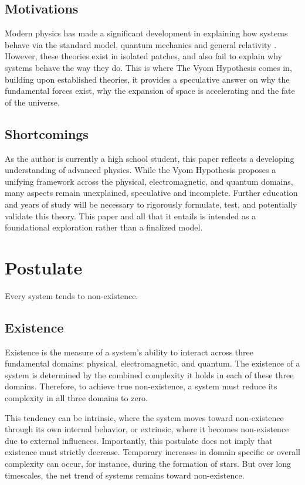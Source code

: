 \documentclass{article}
\begin{document}
\subsection{Motivations}
Modern physics has made a significant development in explaining how systems behave via the standard model, quantum mechanics \cite{dirac1930} and general relativity \cite{einstein1915}. However, these theories exist in isolated patches, and also fail to explain why systems behave the way they do. This is where The Vyom Hypothesis comes in, building upon established theories, it provides a speculative answer on why the fundamental forces exist, why the expansion of space is accelerating and the fate of the universe. 


\subsection{Shortcomings}
As the author is currently a high school student, this paper reflects a developing understanding of advanced physics. While the Vyom Hypothesis proposes a unifying framework across the physical, electromagnetic, and quantum domains, many aspects remain unexplained, speculative and incomplete. Further education and years of study will be necessary to rigorously formulate, test, and potentially validate this theory. This paper and all that it entails is intended as a foundational exploration rather than a finalized model.



\newpage
\section{Postulate}

\begin{center}
Every system tends to non-existence.
\end{center}

\subsection{Existence}
Existence is the measure of a system’s ability to interact across three fundamental domains: physical, electromagnetic, and quantum. The existence of a system is determined by the combined complexity it holds in each of these three domains. Therefore, to achieve true non-existence, a system must reduce its complexity in all three domains to zero.

This tendency can be intrinsic, where the system moves toward non-existence through its own internal behavior, or extrinsic, where it becomes non-existence due to external influences. Importantly, this postulate does not imply that existence must strictly decrease. Temporary increases in domain specific or overall complexity can occur, for instance, during the formation of stars. But over long timescales, the net trend of systems remains toward non-existence.
\end{document}
